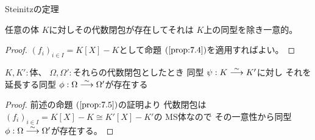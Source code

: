 \documentclass[../master_galois_theory]{subfiles}
\begin{document}
\begin{prop} \label{prop:7.5}
  \rm{Steinitz}の定理

  任意の体 $K$に対しその代数閉包が存在してそれは $K$上の同型を除き一意的。
\end{prop}

\begin{proof}
  $(f_i)_{i \in I} = K[X] - K$として命題 $(\mathrm{\ref{prop:7.4}})$を適用すればよい。
\end{proof}

\begin{corl} \label{corl:7.6}
  $K , K' :$体、 $\Omega , \Omega' :$それらの代数閉包としたとき
  同型 $\psi : K \overset{\sim}{\longrightarrow} K'$に対し
  それを延長する同型 $\phi : \Omega \overset{\sim}{\longrightarrow} \Omega'$が存在する
\end{corl}

\begin{proof}
  前述の命題 $(\mathrm{\ref{prop:7.5}})$の証明より
  代数閉包は $(f_i)_{i \in I} = K[X] - K \cong K'[X] - K'$の \rm{MS}体なので
  その一意性から同型 $\phi : \Omega \overset{\sim}{\longrightarrow} \Omega'$が存在する。
\end{proof}

\clearpage
\end{document}
